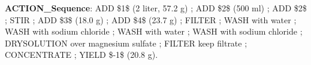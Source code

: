 \begin{tcolorbox}[colback=white!98!black,colframe=white!30!black,boxsep=1.1pt,top=6.75pt]
\begin{tcolorbox}[colback=cyan!7!white,colframe=white!98!black,boxsep=1.1pt,top=6.75pt]
\end{tcolorbox}

\begin{tcolorbox}[colback=orange!7!white,colframe=white!98!black,boxsep=1.1pt,top=6.75pt]
\textbf{ACTION\_Sequence}: ADD \$1\$ (2 liter, 57.2 g) ; ADD \$2\$ (500 ml) ; ADD \$2\$ ; STIR ; ADD \$3\$ (18.0 g) ; ADD \$4\$ (23.7 g) ; FILTER ; WASH with water ; WASH with sodium chloride ; WASH with water ; WASH with sodium chloride ; DRYSOLUTION over magnesium sulfate ; FILTER keep filtrate ; CONCENTRATE ; YIELD \$-1\$ (20.8 g).
\end{tcolorbox}

\end{tcolorbox}

